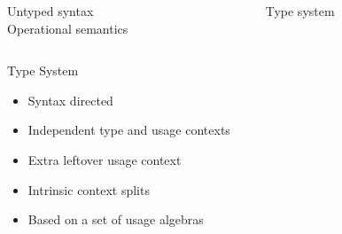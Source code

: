 \documentclass[dvipsnames]{beamer}
\theoremstyle{definition}
\begin{document}
  \begin{frame}[t]
    \begin{columns}[T]
      \begin{column}{0.5\textwidth}
        \centering
        \vspace*{10em}
        Untyped syntax \\
        Operational semantics
        \vspace*{10em}
      \end{column}
      \vrule width 2pt
      \begin{column}{0.5\textwidth}
        \centering
        \vspace*{10em}
        Type system
        \vspace*{10em}
      \end{column}
    \end{columns}
  \end{frame}
    
  \begin{frame}{Type System}
    \begin{itemize}
      \item Syntax directed
      \item Independent type and usage contexts
      \item Extra leftover usage context
      \item Intrinsic context splits
      \item Based on a set of usage algebras
    \end{itemize}
  \end{frame}
  
\end{document}
